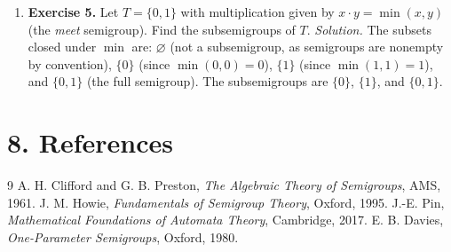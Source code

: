 \begin{enumerate}[leftmargin=*,itemsep=0.9em]
\item \textbf{Exercise 5.} Let $T=\{0,1\}$ with multiplication given by $x\cdot y=\min(x,y)$ (the \emph{meet} semigroup). Find the subsemigroups of $T$. \emph{Solution.} The subsets closed under $\min$ are: $\varnothing$ (not a subsemigroup, as semigroups are nonempty by convention), $\{0\}$ (since $\min(0,0)=0$), $\{1\}$ (since $\min(1,1)=1$), and $\{0,1\}$ (the full semigroup). The subsemigroups are $\{0\}$, $\{1\}$, and $\{0,1\}$.

\end{enumerate}
\section*{8. References}
\begin{thebibliography}{9}
 A. H. Clifford and G. B. Preston, \emph{The Algebraic Theory of Semigroups}, AMS, 1961.
 J. M. Howie, \emph{Fundamentals of Semigroup Theory}, Oxford, 1995.
 J.-E. Pin, \emph{Mathematical Foundations of Automata Theory}, Cambridge, 2017.
 E. B. Davies, \emph{One-Parameter Semigroups}, Oxford, 1980.
\end{thebibliography}
